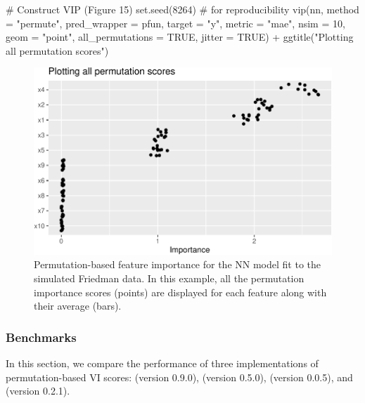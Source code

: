 \begin{Schunk}
\begin{Sinput}
# Construct VIP (Figure 15)
set.seed(8264)  # for reproducibility
vip(nn, method = "permute", pred_wrapper = pfun, target = "y", metric = "mae", 
    nsim = 10, geom = "point", all_permutations = TRUE, jitter = TRUE) +
  ggtitle("Plotting all permutation scores")
\end{Sinput}
\begin{figure}[!htb]

{\centering \includegraphics[width=0.7\linewidth]{greenwell-boehmke_files/figure-latex/vip-nn-mae-all-1} 

}

\caption[Permutation-based feature importance for the NN model fit to the simulated Friedman data]{Permutation-based feature importance for the NN model fit to the simulated Friedman data. In this example, all the permutation importance scores (points) are displayed for each feature along with their average (bars).}\label{fig:vip-nn-mae-all}
\end{figure}
\end{Schunk}

\subsubsection{Benchmarks}

In this section, we compare the performance of three implementations of
permutation-based VI scores:  (version 0.9.0),
 (version 0.5.0),
\newline {} (version 0.0.5), and
 (version 0.2.1).


